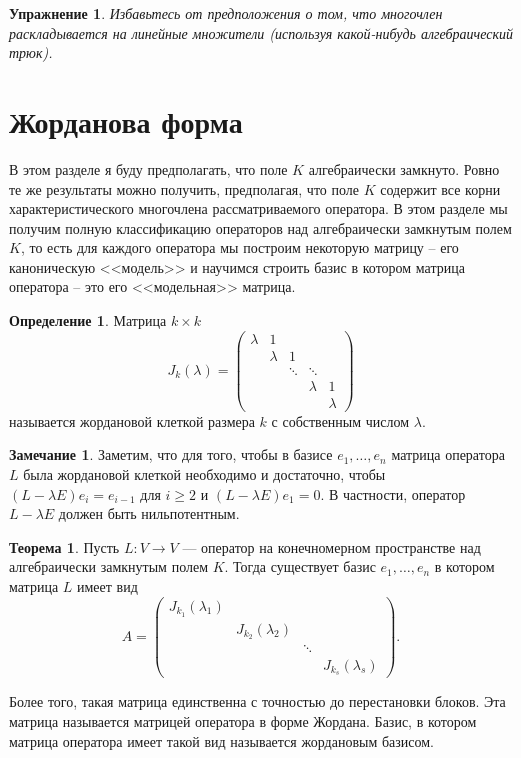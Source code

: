 \documentclass[10pt,a4paper,oneside]{book}
\newtheorem{uprz}{\color{violet!100!black} Упражнение}
\theoremstyle{definition}
\newtheorem*{rem}{\color{green!50!blue}Замечание}
\newtheorem*{defn}{\color{yellow!30!red} Определение}
\newtheorem{thm}{\color{red!40!black}Теорема}
\renewcommand{\geq}{\geqslant}
\def\thrm{\begin{thm}}
\def\ethrm{\end{thm}}
\def\dfn{\begin{defn}}
\def\edfn{\end{defn}}
\def\rm{\begin{rem}}
\def\erm{\end{rem}}
\def\upr{\begin{uprz}}
\def\eupr{\end{uprz}}
\begin{document}
\upr Избавьтесь от предположения о том, что многочлен раскладывается на линейные множители (используя какой-нибудь  алгебраический трюк).
\eupr


\section{Жорданова форма}

В этом разделе я буду предполагать, что  поле $K$ алгебраически замкнуто. Ровно те же результаты можно получить, предполагая, что поле $K$ содержит все корни характеристического многочлена рассматриваемого оператора. В этом разделе мы получим полную классификацию операторов над алгебраически замкнутым полем $K$, то есть для каждого оператора мы построим некоторую матрицу -- его каноническую <<модель>> и научимся строить базис в котором матрица оператора -- это его <<модельная>> матрица.

\dfn
Матрица $k\times k$
$$J_k(\lambda) = \begin{pmatrix}
\lambda& 1&& \\
& \lambda &1& \\
&&\ddots &\ddots& \\
&  && \lambda & 1\\
&  &&& \lambda
\end{pmatrix}
$$
называется жордановой клеткой размера $k$ с собственным числом $\lambda$.
\edfn

\rm Заметим, что для того, чтобы в базисе $e_1,\dots,e_n$ матрица оператора $L$ была жордановой клеткой необходимо и достаточно, чтобы $(L-\lambda E)e_i=e_{i-1}$ для $i\geq 2$ и $(L-\lambda E)e_1=0$. В частности, оператор $L-\lambda E$ должен быть нильпотентным.
\erm







\thrm Пусть $L\colon V \to V$ --- оператор на конечномерном пространстве над алгебраически замкнутым полем $K$.
Тогда существует базис $e_1,\dots, e_n$ в котором матрица $L$ имеет вид
$$A=\begin{pmatrix}
J_{k_1}(\lambda_1) &&&\\
& J_{k_2}(\lambda_2) &&\\
&& \ddots& \\
&&& J_{k_s}(\lambda_s)

\end{pmatrix}.
$$

Более того, такая матрица единственна с точностью до перестановки блоков. Эта матрица называется матрицей оператора в форме Жордана. Базис, в котором матрица оператора имеет такой вид называется жордановым базисом.
\ethrm
\proof
\end{document}
